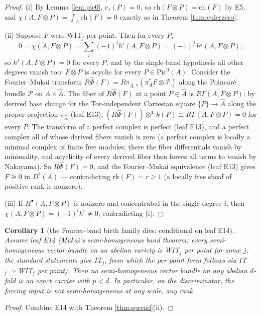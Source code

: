 \documentclass[11pt]{article}
\newtheorem{corollary}{Corollary}
\begin{document}
\begin{proof}
(i) By Lemma \ref{lem:pic0}, $c_1(P)=0$, so $\mathrm{ch}(F\otimes P)=\mathrm{ch}(F)$ by E5, and
$\chi(A,F\otimes P)=\int_A\mathrm{ch}(F)=0$ exactly as in Theorem \ref{thm:eulerzero}.

(ii) Suppose $F$ were WIT$_j$ per point. Then for every $P$,
\[
0=\chi(A,F\otimes P)=\sum_i(-1)^i h^i(A,F\otimes P)=(-1)^j\,h^j(A,F\otimes P),
\]
so $h^j(A,F\otimes P)=0$ for every $P$, and by the single-band hypothesis all other degrees vanish too:
$F\otimes P$ is acyclic for every $P\in\mathrm{Pic}^0(A)$. Consider the Fourier--Mukai transform
$R\widehat\Phi(F)=R\pi_{\hat A,*}(\pi_A^\ast F\otimes\mathcal{P})$ along the Poincar\'e bundle
$\mathcal{P}$ on $A\times\hat A$. The fiber of $R\widehat\Phi(F)$ at a point $P\in\hat A$ is
$R\Gamma(A,F\otimes P)$: by derived base change for the Tor-independent Cartesian square
$\{P\}\to\hat A$ along the proper projection $\pi_{\hat A}$ (leaf E13),
$(R\widehat\Phi(F))\otimes^{\mathbf{L}}k(P)\cong R\Gamma(A,F\otimes P)=0$ for every $P$. The transform of
a perfect complex is perfect (leaf E13), and a perfect complex all of whose derived fibers vanish is zero
(a perfect complex is locally a minimal complex of finite free modules; there the fiber
differentials vanish by minimality, and acyclicity of every derived fiber then forces all terms to
vanish by Nakayama).
So $R\widehat\Phi(F)=0$, and the Fourier--Mukai equivalence (leaf E13) gives $F\cong0$ in
$D^b(A)$ --- contradicting $\mathrm{rk}(F)=r\ge1$ (a locally free sheaf of positive rank is nonzero).

(iii) If $H^\bullet(A,F\otimes P)$ is nonzero and concentrated in the single degree $i$, then
$\chi(A,F\otimes P)=(-1)^i h^i\ne0$, contradicting (i).
\end{proof}

\begin{corollary}[the Fourier-band birth family dies; conditional on leaf E14]\label{cor:semihom}
Assume leaf E14 (Mukai's semi-homogeneous band theorem: every semi-homogeneous vector bundle on an
abelian variety is WIT$_j$ per point for some $j$; the standard statements give IT$_j$, from which the
per-point form follows via IT$_j\Rightarrow$WIT$_j$ per point). Then no semi-homogeneous vector bundle on any
abelian $d$-fold is an exact carrier with $p<d$. In particular, on the discriminator, the forcing input
is not semi-homogeneous at any scale, any rank.
\end{corollary}

\begin{proof}
Combine E14 with Theorem \ref{thm:spread}(ii).
\end{proof}
\end{document}
